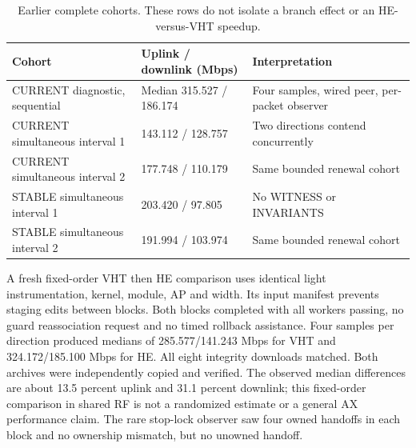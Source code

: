 \documentclass[11pt,letterpaper,oneside]{article}
\begin{document}
\begin{table}[H]\small\centering
\begin{tabularx}{\linewidth}{lYY}\toprule
Cohort & Uplink / downlink (Mbps) & Interpretation\\\midrule
CURRENT diagnostic, sequential & Median 315.527 / 186.174 & Four samples, wired peer, per-packet observer\\
CURRENT simultaneous interval 1 & 143.112 / 128.757 & Two directions contend concurrently\\
CURRENT simultaneous interval 2 & 177.748 / 110.179 & Same bounded renewal cohort\\
STABLE simultaneous interval 1 & 203.420 / 97.805 & No WITNESS or INVARIANTS\\
STABLE simultaneous interval 2 & 191.994 / 103.974 & Same bounded renewal cohort\\\bottomrule
\end{tabularx}\caption{Earlier complete cohorts. These rows do not isolate a branch effect or an HE-versus-VHT speedup.}\end{table}
A fresh fixed-order VHT then HE comparison uses identical light instrumentation, kernel, module, AP and width. Its input manifest prevents staging edits between blocks. Both blocks completed with all workers passing, no guard reassociation request and no timed rollback assistance. Four samples per direction produced medians of 285.577/141.243 Mbps for VHT and 324.172/185.100 Mbps for HE. All eight integrity downloads matched. Both archives were independently copied and verified. The observed median differences are about 13.5 percent uplink and 31.1 percent downlink; this fixed-order comparison in shared RF is not a randomized estimate or a general AX performance claim. The rare stop-lock observer saw four owned handoffs in each block and no ownership mismatch, but no unowned handoff.
\end{document}
